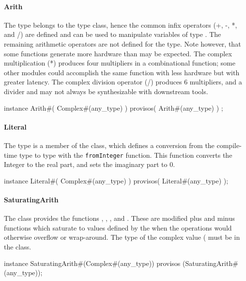 \paragraph{Arith}
The type  belongs to the   type class, hence the
common infix operators (+, -, *, and /) are defined and can be used to
manipulate variables of type .  The remaining arithmetic
operators  are not defined for the  type.  Note however, that some
functions generate more hardware than may be expected.   The
complex multiplication (*) produces four multipliers in a
combinational function; some other modules could 
accomplish the same function with less hardware but with greater
latency.  The complex division operator (/)  produces 6 multipliers, and a
divider and  may not always be synthesizable with downstream tools.



\begin{libverbatim}
instance Arith#( Complex#(any_type) ) 
      provisos( Arith#(any_type) ) ;
\end{libverbatim}

\paragraph{Literal}
The  type is a member of the  class, which
defines a conversion from the compile-time  type to
 type with the {\tt fromInteger} function.  This
function converts the Integer to the real part, and sets the
imaginary part to 0.

\begin{libverbatim}
instance Literal#( Complex#(any_type) )
   provisos( Literal#(any_type) );
\end{libverbatim}

\paragraph{SaturatingArith}

The  class provides the functions , 
, , and .  These  are
modified plus and minus functions which 
saturate to values defined by the  when the
operations would otherwise overflow or wrap-around.   The type of the
complex value ( must be in the  class.

\begin{libverbatim}
instance SaturatingArith#(Complex#(any_type))
   provisos (SaturatingArith#(any_type));
\end{libverbatim}


